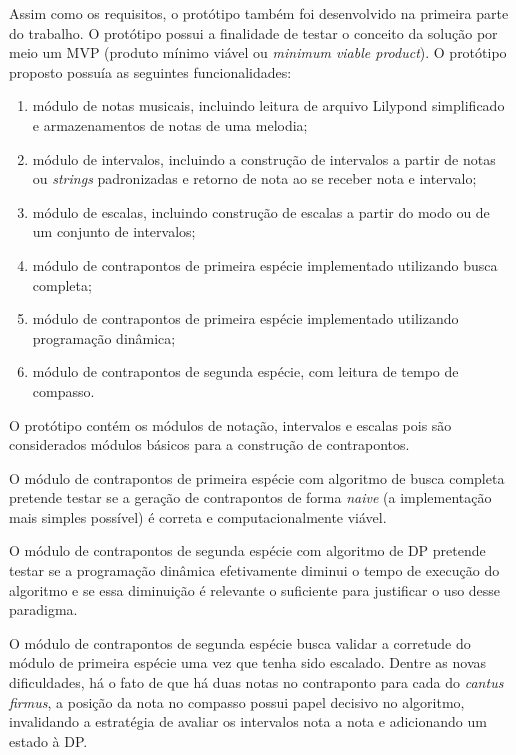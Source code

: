     Assim como os requisitos, o protótipo também foi desenvolvido na primeira parte do trabalho. O protótipo possui a finalidade de testar o conceito da solução por meio um MVP (produto mínimo viável ou \textit{minimum viable product}). O protótipo proposto possuía as seguintes funcionalidades:

    \begin{enumerate}
      \item módulo de notas musicais, incluindo leitura de arquivo Lilypond simplificado e armazenamentos de notas de uma melodia;
      \item módulo de intervalos, incluindo a construção de intervalos a partir de notas ou \textit{strings} padronizadas e retorno de nota ao se receber nota e intervalo;
      \item módulo de escalas, incluindo construção de escalas a partir do modo ou de um conjunto de intervalos;
      \item módulo de contrapontos de primeira espécie implementado utilizando busca completa;
      \item módulo de contrapontos de primeira espécie implementado utilizando programação dinâmica;
      \item módulo de contrapontos de segunda espécie, com leitura de tempo de compasso.
    \end{enumerate}

    O protótipo contém os módulos de notação, intervalos e escalas pois são considerados módulos básicos para a construção de contrapontos.

    O módulo de contrapontos de primeira espécie com algoritmo de busca completa pretende testar se a geração de contrapontos de forma \textit{naive} (a implementação mais simples possível) é correta e computacionalmente viável.

    O módulo de contrapontos de segunda espécie com algoritmo de DP pretende testar se a programação dinâmica efetivamente diminui o tempo de execução do algoritmo e se essa diminuição é relevante o suficiente para justificar o uso desse paradigma.

    O módulo de contrapontos de segunda espécie busca validar a corretude do módulo de primeira espécie uma vez que tenha sido escalado. Dentre as novas dificuldades, há o fato de que há duas notas no contraponto para cada do \textit{cantus firmus}, a posição da nota no compasso possui papel decisivo no algoritmo, invalidando a estratégia de avaliar os intervalos nota a nota e adicionando um estado à DP.

